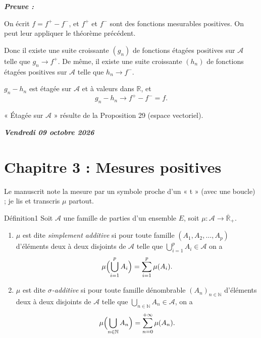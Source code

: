 \documentclass[11pt,a4paper]{article}
\newcommand{\R}{\mathbb{R}}
\newcommand{\N}{\mathbb{N}}
\newcommand{\Rb}{\overline{\mathbb{R}}}
\newcommand{\A}{\mathscr{A}}
\newenvironment{preuve}{\par\textit{\textbf{Preuve :}}\par\nopagebreak[4]}{\par}
\newcommand{\datepage}[1]{\begin{flushright}\small\bfseries\itshape\color{bleuclair}#1\end{flushright}\vspace{-8pt}}
\begin{document}
\begin{preuve}\end{preuve}

On écrit $f=f^{+}-f^{-}$, et $f^{+}$ et $f^{-}$ sont des fonctions mesurables positives.
On peut leur appliquer le théorème précédent.

Donc il existe une suite croissante $(g_n)$ de fonctions étagées positives sur $\A$ telle que
$g_n\to f^{+}$. De même, il existe une suite croissante $(h_n)$ de fonctions étagées positives
sur $\A$ telle que $h_n\to f^{-}$.

$g_n-h_n$ est étagée sur $\A$ et à valeurs dans $\R$, et
\[
  g_n-h_n\longrightarrow f^{+}-f^{-}=f .
\]

\begin{note}
« Étagée sur $\A$ » résulte de la Proposition 29 (espace vectoriel).
\end{note}

\newpage
\datepage{Vendredi 09 octobre 2026}
\section*{Chapitre 3 : Mesures positives}

\begin{note}
Le manuscrit note la mesure par un symbole proche d'un « t » (avec une boucle) ; je lis et transcris $\mu$ partout.
\end{note}

\begin{enonce}{Définition}{1}
Soit $\A$ une famille de parties d'un ensemble $E$, soit $\mu:\A\to\Rb_+$.
\begin{enumerate}[label=\textbf{\arabic*-},leftmargin=1.2cm]
  \item $\mu$ est dite \emph{simplement additive} si pour toute famille $(A_1,A_2,\dots,A_p)$ d'éléments deux à deux disjoints de $\A$
        telle que $\displaystyle\bigcup_{i=1}^{p}A_i\in\A$ on a
        \[
          \mu\Bigl(\bigcup_{i=1}^{p}A_i\Bigr)=\sum_{i=1}^{p}\mu(A_i).
        \]
  \item $\mu$ est dite \emph{$\sigma$-additive} si pour toute famille dénombrable $(A_n)_{n\in\N}$ d'éléments deux à deux disjoints de $\A$
        telle que $\displaystyle\bigcup_{n\in\N}A_n\in\A$, on a
        \[
          \mu\Bigl(\bigcup_{n\in\N}A_n\Bigr)=\sum_{n=0}^{+\infty}\mu(A_n).
        \]
\end{enumerate}
\end{enonce}
\end{document}
